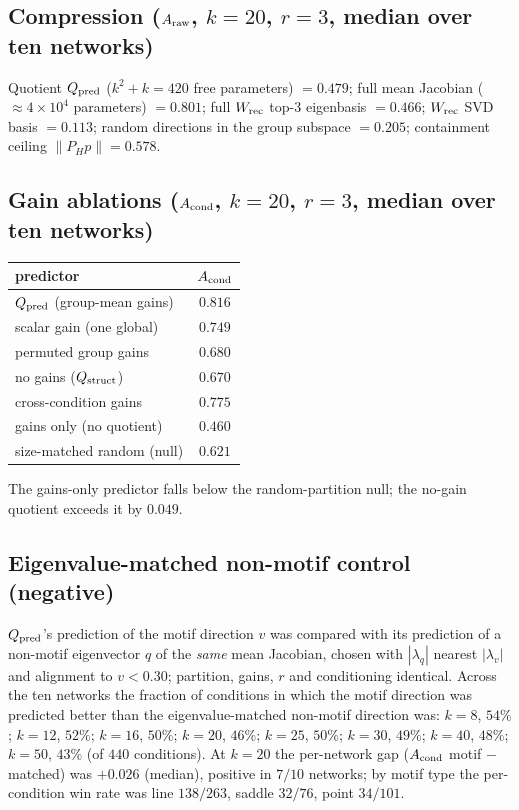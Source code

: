 \documentclass[11pt]{article}
\begin{document}
\subsection{Compression ($A_{\rm raw}$, $k=20$, $r=3$, median over ten networks)}
Quotient $Q_{\rm pred}$ ($k^{2}+k=420$ free parameters) $=0.479$; full mean Jacobian
($\approx4\times10^{4}$ parameters) $=0.801$; full $W_{\rm rec}$ top-$3$ eigenbasis $=0.466$;
$W_{\rm rec}$ SVD basis $=0.113$; random directions in the group subspace $=0.205$; containment
ceiling $\lVert P_{H}p\rVert=0.578$.

\subsection{Gain ablations ($A_{\rm cond}$, $k=20$, $r=3$, median over ten networks)}
\begin{center}\small
\begin{tabular}{lc}
\toprule
predictor & $A_{\rm cond}$ \\
\midrule
$Q_{\rm pred}$ (group-mean gains)          & $0.816$ \\
scalar gain (one global)                    & $0.749$ \\
permuted group gains                        & $0.680$ \\
no gains ($Q_{\rm struct}$)                 & $0.670$ \\
cross-condition gains                       & $0.775$ \\
gains only (no quotient)                    & $0.460$ \\
size-matched random (null)                  & $0.621$ \\
\bottomrule
\end{tabular}
\end{center}
The gains-only predictor falls below the random-partition null; the no-gain quotient exceeds it
by $0.049$.

\subsection{Eigenvalue-matched non-motif control (negative)}
\label{sec:eigmatched}
$Q_{\rm pred}$'s prediction of the motif direction $v$ was compared with its prediction of a
non-motif eigenvector $q$ of the \emph{same} mean Jacobian, chosen with $|\lambda_{q}|$ nearest
$|\lambda_{v}|$ and alignment to $v<0.30$; partition, gains, $r$ and conditioning identical.
Across the ten networks the fraction of conditions in which the motif direction was predicted
better than the eigenvalue-matched non-motif direction was: $k=8$, $54\%$; $k=12$, $52\%$;
$k=16$, $50\%$; $k=20$, $46\%$; $k=25$, $50\%$; $k=30$, $49\%$; $k=40$, $48\%$; $k=50$, $43\%$
(of $440$ conditions). At $k=20$ the per-network gap ($A_{\rm cond}$ motif $-$ matched) was
$+0.026$ (median), positive in $7/10$ networks; by motif type the per-condition win rate was
line $138/263$, saddle $32/76$, point $34/101$.
\end{document}
